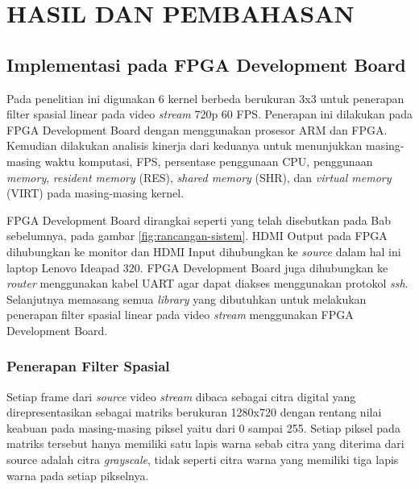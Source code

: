 
\chapter{HASIL DAN PEMBAHASAN}


\section{Implementasi pada FPGA Development Board}

Pada penelitian ini digunakan 6 kernel berbeda berukuran 3x3 untuk penerapan filter spasial linear pada video \textit{stream} 720p 60 FPS. Penerapan ini dilakukan pada FPGA Development Board dengan menggunakan prosesor ARM dan FPGA. Kemudian dilakukan analisis kinerja dari keduanya untuk menunjukkan masing-masing waktu komputasi, FPS, persentase penggunaan CPU, penggunaan \textit{memory}, \textit{resident memory} (RES), \textit{shared memory} (SHR), dan \textit{virtual memory} (VIRT) pada masing-masing kernel.

FPGA Development Board dirangkai seperti yang telah disebutkan pada Bab sebelumnya, pada gambar \ref{fig:rancangan-sistem}. HDMI Output pada FPGA dihubungkan ke monitor dan HDMI Input dihubungkan ke \textit{source} dalam hal ini laptop Lenovo Ideapad 320. FPGA Development Board juga dihubungkan ke \textit{router} menggunakan kabel UART agar dapat diakses menggunakan protokol \textit{ssh}. Selanjutnya memasang semua \textit{library} yang dibutuhkan untuk melakukan penerapan filter spasial linear pada video \textit{stream} menggunakan FPGA Development Board.

\subsection{Penerapan Filter Spasial}
Setiap frame dari \textit{source} video \textit{stream} dibaca sebagai citra digital yang direpresentasikan sebagai matriks berukuran 1280x720 dengan rentang nilai keabuan pada masing-masing piksel yaitu dari 0 sampai 255. Setiap piksel pada matriks tersebut hanya memiliki satu lapis warna sebab citra yang diterima dari source adalah citra \textit{grayscale}, tidak seperti citra warna yang memiliki tiga lapis warna pada setiap pikselnya. 

